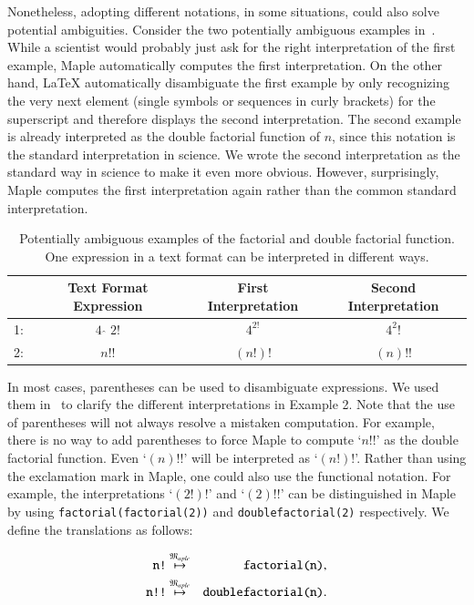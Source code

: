 \documentclass[a4paper,11pt]{article}
\newcommand{\Maple}{Maple}
\newcommand{\langMaple}{\mathfrak{M}_{aple}}
\theoremstyle{defTheoStyle}
\theoremstyle{defExampStyle}
\begin{document}
Nonetheless, adopting different notations, in some situations, could also solve potential ambiguities. Consider the two potentially ambiguous examples in~. While a scientist would probably just ask for the right interpretation of the first example, \Maple{} automatically computes the first interpretation. On the other hand, \LaTeX{} automatically disambiguate the first example by only recognizing the very next element (single symbols or sequences in curly brackets) for the superscript and therefore displays the second interpretation. The second example is already interpreted as the double factorial function of $n$, since this notation is the standard interpretation in science. We wrote the second interpretation as the standard way in science to make it even more obvious. However, surprisingly, \Maple{} computes the first interpretation again rather than the common standard interpretation.
\begin{table}[ht]
\centering
\begin{tabular}{lccc}
	\hline
	& Text Format Expression & First Interpretation & Second Interpretation\\
	\hline
	1: & \rule{0pt}{0.9\normalbaselineskip} $4\ \hat{\ }\ 2!$ & $4^{2!}$ & $4^2!$ \\
	2: & $n!!$ & $(n!)!$ & $(n)!!$\\
	\hline
\end{tabular}
\caption{Potentially ambiguous examples of the factorial and double factorial function. One expression in a text format can be interpreted in different ways.}
\label{tab:amb_ex}
\end{table}

In most cases, parentheses can be used to disambiguate expressions. We used them in~ to clarify the different interpretations in Example 2. Note that the use of parentheses will not always resolve a mistaken computation. For example, there is no way to add parentheses to force \Maple{} to compute `$n!!$' as the double factorial function. Even `$(n)!!$' will be interpreted as `$(n!)!$'. Rather than using the exclamation mark in \Maple, one could also use the functional notation. For example, the interpretations `$(2!)!$' and `$(2)!!$' can be distinguished in \Maple{} by using \verb|factorial(factorial(2))| and \verb|doublefactorial(2)| respectively. We define the translations as follows:

\begin{eqnarray*}
\verb|n!| &\overset{\langMaple}{\mapsto}& \verb|factorial(n)|,\\
\verb|n!!| &\overset{\langMaple}{\mapsto}& \verb|doublefactorial(n)|.
\end{eqnarray*}
\end{document}
